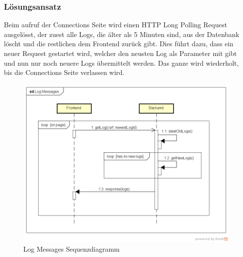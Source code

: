 \subsubsection{Lösungsansatz}
Beim aufruf der Connections Seite wird einen HTTP Long Polling Request ausgelösst, der zuest alle Logs, die älter als 5 Minuten sind, aus der Datenbank löscht und die restlichen dem Frontend zurück gibt. Dies führt dazu, dass ein neuer Request gestartet wird, welcher den neusten Log als Parameter mit gibt und nun nur noch neuere Logs übermittelt werden. Das ganze wird wiederholt, bis die Connections Seite verlassen wird.\\
\begin{figure}[H]
\centering
\includegraphics[width=400pt]{images/log_messages_seq.png}
\caption[Log Messages Sequenzdiagramm]{Log Messages Sequenzdiagramm}
\end{figure}
